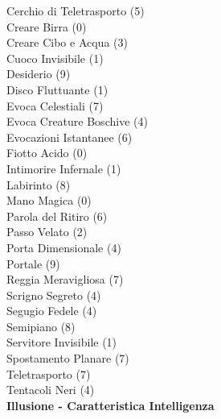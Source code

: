 \begin{multicols}{3}
{	
	Cerchio di Teletrasporto (5)\\
	Creare Birra (0)\\
	Creare Cibo e Acqua (3)\\
	Cuoco Invisibile (1)\\
	Desiderio (9)\\
	Disco Fluttuante (1)\\
	Evoca Celestiali (7)\\
	Evoca Creature Boschive (4)\\
	Evocazioni Istantanee (6)\\
	Fiotto Acido (0)\\
	Intimorire Infernale (1)\\
	Labirinto (8)\\
	Mano Magica (0)\\
	Parola del Ritiro (6)\\
	Passo Velato (2)\\
	Porta Dimensionale (4)\\
	Portale (9)\\
	Reggia Meravigliosa (7)\\
	Scrigno Segreto (4)\\
	Segugio Fedele (4)\\
	Semipiano (8)\\
	Servitore Invisibile (1)\\
	Spostamento Planare (7)\\
	Teletrasporto (7)\\
	Tentacoli Neri (4)\\

	\medskip\textbf{Illusione - Caratteristica Intelligenza}

}
\end{multicols}
